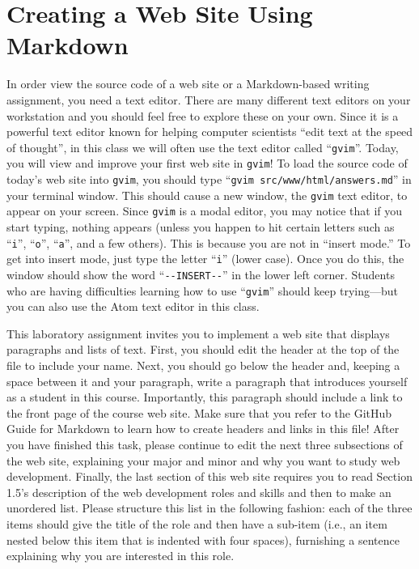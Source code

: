 \documentclass[11pt]{article}
\newcommand{\command}[1]{``\lstinline{#1}''}
\newcommand{\program}[1]{\lstinline{#1}}
\begin{document}
\section*{Creating a Web Site Using Markdown}

In order view the source code of a web site or a Markdown-based writing assignment, you need a text editor. There are
many different text editors on your workstation and you should feel free to explore these on your own. Since it is a
powerful text editor known for helping computer scientists ``edit text at the speed of thought'', in this class we will
often use the text editor called \command{gvim}. Today, you will view and improve your first web site in {\tt gvim}! To
load the source code of today's web site into \program{gvim}, you should type \command{gvim src/www/html/answers.md} in your
terminal window. This should cause a new window, the \program{gvim} text editor, to appear on your screen. Since
\program{gvim} is a modal editor, you may notice that if you start typing, nothing appears (unless you happen to hit
certain letters such as \command{i}, \command{o}, \command{a}, and a few others). This is because you are not in
``insert mode.'' To get into insert mode, just type the letter \command{i} (lower case). Once you do this, the window
should show the word \command{--INSERT--} in the lower left corner. Students who are having difficulties learning how to
use \command{gvim} should keep trying---but you can also use the Atom text editor in this class.

This laboratory assignment invites you to implement a web site that displays paragraphs and lists of text. First, you
should edit the header at the top of the file to include your name. Next, you should go below the header and, keeping a
space between it and your paragraph, write a paragraph that introduces yourself as a student in this course.
Importantly, this paragraph should include a link to the front page of the course web site. Make sure that you refer to
the GitHub Guide for Markdown to learn how to create headers and links in this file! After you have finished this task,
please continue to edit the next three subsections of the web site, explaining your major and minor and why you want to
study web development. Finally, the last section of this web site requires you to read Section 1.5's description of the
web development roles and skills and then to make an unordered list. Please structure this list in the following
fashion: each of the three items should give the title of the role and then have a sub-item (i.e., an item nested below
this item that is indented with four spaces), furnishing a sentence explaining why you are interested in this role.
\end{document}
